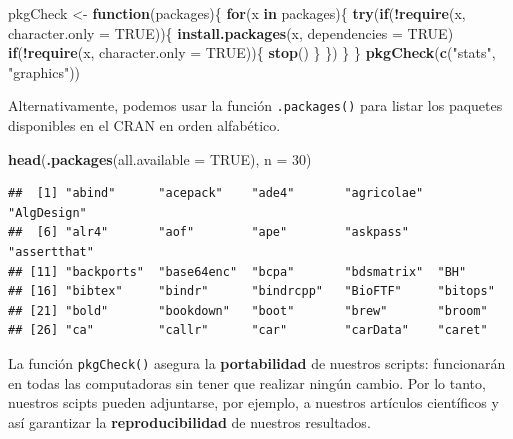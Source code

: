 \documentclass[
]{book}
\newenvironment{Shaded}{\begin{snugshade}}{\end{snugshade}}
\newcommand{\ControlFlowTok}[1]{\textcolor[rgb]{0.13,0.29,0.53}{\textbf{#1}}}
\newcommand{\DataTypeTok}[1]{\textcolor[rgb]{0.13,0.29,0.53}{#1}}
\newcommand{\DecValTok}[1]{\textcolor[rgb]{0.00,0.00,0.81}{#1}}
\newcommand{\KeywordTok}[1]{\textcolor[rgb]{0.13,0.29,0.53}{\textbf{#1}}}
\newcommand{\NormalTok}[1]{#1}
\newcommand{\OperatorTok}[1]{\textcolor[rgb]{0.81,0.36,0.00}{\textbf{#1}}}
\newcommand{\OtherTok}[1]{\textcolor[rgb]{0.56,0.35,0.01}{#1}}
\newcommand{\StringTok}[1]{\textcolor[rgb]{0.31,0.60,0.02}{#1}}
\begin{document}
\begin{Shaded}
\begin{Highlighting}[]
\NormalTok{pkgCheck <-}\StringTok{ }\ControlFlowTok{function}\NormalTok{(packages)\{}
    \ControlFlowTok{for}\NormalTok{(x }\ControlFlowTok{in}\NormalTok{ packages)\{}
        \KeywordTok{try}\NormalTok{(}\ControlFlowTok{if}\NormalTok{(}\OperatorTok{!}\KeywordTok{require}\NormalTok{(x, }\DataTypeTok{character.only =} \OtherTok{TRUE}\NormalTok{))\{}
            \KeywordTok{install.packages}\NormalTok{(x, }\DataTypeTok{dependencies =} \OtherTok{TRUE}\NormalTok{)}
            \ControlFlowTok{if}\NormalTok{(}\OperatorTok{!}\KeywordTok{require}\NormalTok{(x, }\DataTypeTok{character.only =} \OtherTok{TRUE}\NormalTok{))\{}
                \KeywordTok{stop}\NormalTok{()}
\NormalTok{            \}}
\NormalTok{        \})}
\NormalTok{    \}}
\NormalTok{\}}
\KeywordTok{pkgCheck}\NormalTok{(}\KeywordTok{c}\NormalTok{(}\StringTok{"stats"}\NormalTok{, }\StringTok{"graphics"}\NormalTok{))}
\end{Highlighting}
\end{Shaded}

Alternativamente, podemos usar la función \texttt{.packages()} para listar los paquetes disponibles en el CRAN en orden alfabético.

\begin{Shaded}
\begin{Highlighting}[]
\KeywordTok{head}\NormalTok{(}\KeywordTok{.packages}\NormalTok{(}\DataTypeTok{all.available =} \OtherTok{TRUE}\NormalTok{), }\DataTypeTok{n =} \DecValTok{30}\NormalTok{)}
\end{Highlighting}
\end{Shaded}

\begin{verbatim}
##  [1] "abind"      "acepack"    "ade4"       "agricolae"  "AlgDesign" 
##  [6] "alr4"       "aof"        "ape"        "askpass"    "assertthat"
## [11] "backports"  "base64enc"  "bcpa"       "bdsmatrix"  "BH"        
## [16] "bibtex"     "bindr"      "bindrcpp"   "BioFTF"     "bitops"    
## [21] "bold"       "bookdown"   "boot"       "brew"       "broom"     
## [26] "ca"         "callr"      "car"        "carData"    "caret"
\end{verbatim}

La función \texttt{pkgCheck()} asegura la \textbf{portabilidad} de nuestros scripts: funcionarán en todas las computadoras sin tener que realizar ningún cambio. Por lo tanto, nuestros scipts pueden adjuntarse, por ejemplo, a nuestros artículos científicos y así garantizar la \textbf{reproducibilidad} de nuestros resultados.
\end{document}
